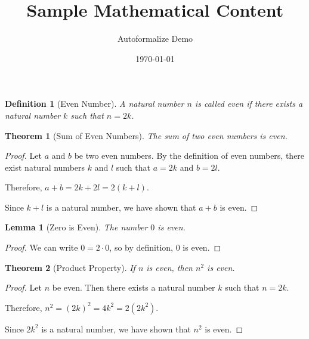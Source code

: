 \documentclass{article}
\newtheorem{theorem}{Theorem}
\newtheorem{lemma}{Lemma}
\newtheorem{definition}{Definition}
\begin{document}
\title{Sample Mathematical Content}
\author{Autoformalize Demo}
\date{\today}
\maketitle

\begin{definition}[Even Number]
\label{def:even}
A natural number $n$ is called even if there exists a natural number $k$ such that $n = 2k$.
\end{definition}

\begin{theorem}[Sum of Even Numbers]
\label{thm:sum_even}
The sum of two even numbers is even.
\end{theorem}

\begin{proof}
Let $a$ and $b$ be two even numbers. By the definition of even numbers, there exist natural numbers $k$ and $l$ such that $a = 2k$ and $b = 2l$.

Therefore, $a + b = 2k + 2l = 2(k + l)$.

Since $k + l$ is a natural number, we have shown that $a + b$ is even.
\end{proof}

\begin{lemma}[Zero is Even]
\label{lem:zero_even}
The number $0$ is even.
\end{lemma}

\begin{proof}
We can write $0 = 2 \cdot 0$, so by definition, $0$ is even.
\end{proof}

\begin{theorem}[Product Property]
If $n$ is even, then $n^2$ is even.
\end{theorem}

\begin{proof}
Let $n$ be even. Then there exists a natural number $k$ such that $n = 2k$.

Therefore, $n^2 = (2k)^2 = 4k^2 = 2(2k^2)$.

Since $2k^2$ is a natural number, we have shown that $n^2$ is even.
\end{proof}
\end{document}
